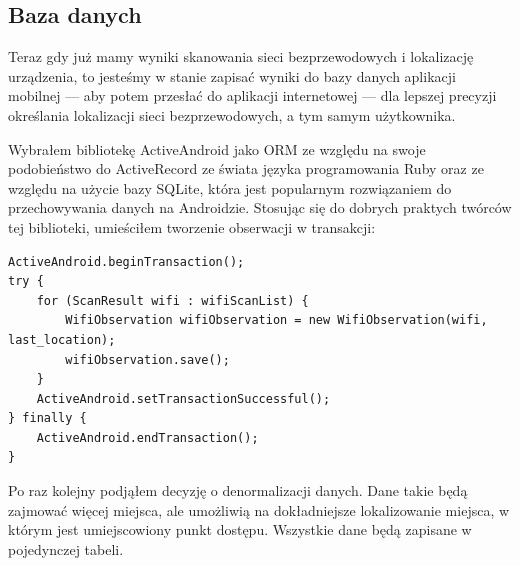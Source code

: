 \subsection{Baza danych}
Teraz gdy już mamy wyniki skanowania sieci bezprzewodowych i lokalizację urządzenia, to jesteśmy w stanie zapisać wyniki do bazy danych aplikacji mobilnej — aby potem przesłać do aplikacji internetowej — dla lepszej precyzji określania lokalizacji sieci bezprzewodowych, a tym samym użytkownika.

Wybrałem bibliotekę ActiveAndroid jako ORM ze względu na swoje podobieństwo do ActiveRecord ze świata języka programowania Ruby oraz ze względu na użycie bazy SQLite, która jest popularnym rozwiązaniem do przechowywania danych na Androidzie. Stosując się do dobrych praktych twórców tej biblioteki, umieściłem tworzenie obserwacji w transakcji:

\begin{verbatim}
ActiveAndroid.beginTransaction();
try {
    for (ScanResult wifi : wifiScanList) {
        WifiObservation wifiObservation = new WifiObservation(wifi, last_location);
        wifiObservation.save();
    }
    ActiveAndroid.setTransactionSuccessful();
} finally {
    ActiveAndroid.endTransaction();
}
\end{verbatim}

Po raz kolejny podjąłem decyzję o denormalizacji danych. Dane takie będą zajmować więcej miejsca, ale umożliwią na dokładniejsze lokalizowanie miejsca, w którym jest umiejscowiony punkt dostępu. Wszystkie dane będą zapisane w pojedynczej tabeli.

